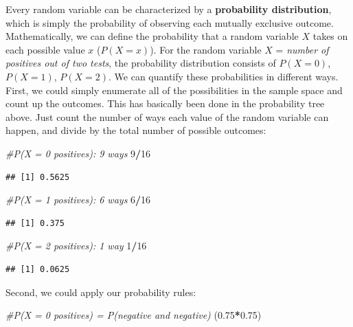 \documentclass[
]{book}
\newenvironment{Shaded}{\begin{snugshade}}{\end{snugshade}}
\newcommand{\CommentTok}[1]{\textcolor[rgb]{0.56,0.35,0.01}{\textit{#1}}}
\newcommand{\DecValTok}[1]{\textcolor[rgb]{0.00,0.00,0.81}{#1}}
\newcommand{\FloatTok}[1]{\textcolor[rgb]{0.00,0.00,0.81}{#1}}
\newcommand{\NormalTok}[1]{#1}
\newcommand{\SpecialCharTok}[1]{\textcolor[rgb]{0.81,0.36,0.00}{\textbf{#1}}}
\begin{document}
Every random variable can be characterized by a \textbf{probability distribution}, which is simply the probability of observing each mutually exclusive outcome. Mathematically, we can define the probability that a random variable \(X\) takes on each possible value \(x\) (\(P(X = x)\)). For the random variable \(X\) = \emph{number of positives out of two tests}, the probability distribution consists of \(P(X = 0)\), \(P(X = 1)\), \(P(X = 2)\). We can quantify these probabilities in different ways. First, we could simply enumerate all of the possibilities in the sample space and count up the outcomes. This has basically been done in the probability tree above. Just count the number of ways each value of the random variable can happen, and divide by the total number of possible outcomes:

\begin{Shaded}
\begin{Highlighting}[]
\CommentTok{\#P(X = 0 positives): 9 ways}
\DecValTok{9}\SpecialCharTok{/}\DecValTok{16}
\end{Highlighting}
\end{Shaded}

\begin{verbatim}
## [1] 0.5625
\end{verbatim}

\begin{Shaded}
\begin{Highlighting}[]
\CommentTok{\#P(X = 1 positives): 6 ways}
\DecValTok{6}\SpecialCharTok{/}\DecValTok{16}
\end{Highlighting}
\end{Shaded}

\begin{verbatim}
## [1] 0.375
\end{verbatim}

\begin{Shaded}
\begin{Highlighting}[]
\CommentTok{\#P(X = 2 positives): 1 way}
\DecValTok{1}\SpecialCharTok{/}\DecValTok{16}
\end{Highlighting}
\end{Shaded}

\begin{verbatim}
## [1] 0.0625
\end{verbatim}

Second, we could apply our probability rules:

\begin{Shaded}
\begin{Highlighting}[]
\CommentTok{\#P(X = 0 positives) = P(negative and negative)}
\NormalTok{(}\FloatTok{0.75}\SpecialCharTok{*}\FloatTok{0.75}\NormalTok{)}
\end{Highlighting}
\end{Shaded}
\end{document}
